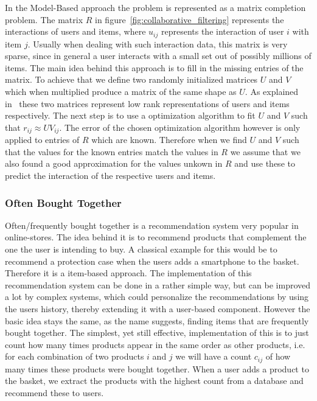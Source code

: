 In the Model-Based approach the problem is represented as a matrix completion problem.
The matrix $R$ in figure~\ref{fig:collaborative_filtering} represents the interactions of users and items, where $u_{ij}$ represents the interaction of user $i$ with item $j$.
Usually when dealing with such interaction data, this matrix is very sparse, since in general a user interacts with a small set out of possibly millions of items.
The main idea behind this approach is to fill in the missing entries of the matrix.
To achieve that we define two randomly initialized matrices $U$ and $V$ which when multiplied produce a matrix of the same shape as $U$.
As explained in~\cite{collaborative_filtering} these two matrices represent low rank representations of users and items respectively.
The next step is to use a optimization algorithm to fit $U$ and $V$ such that $r_{ij} \approx UV_{ij}$.
The error of the chosen optimization algorithm however is only applied to entries of $R$ which are known.
Therefore when we find $U$ and $V$ such that the values for the known entries match the values in $R$ we assume that we also found a good approximation for the values unkown in $R$ and use these to predict the interaction of the respective users and items.

\subsubsection{Often Bought Together}
Often/frequently bought together is a recommendation system very popular in online-stores.
The idea behind it is to recommend products that complement the one the user is intending to buy.
A classical example for this would be to recommend a protection case when the users adds a smartphone to the basket.
Therefore it is a item-based approach.
The implementation of this recommendation system can be done in a rather simple way, but can be improved a lot by complex systems, which could personalize the recommendations by using the users history, thereby extending it with a user-based component.
However the basic idea stays the same, as the name suggests, finding items that are frequently bought together.
The simplest, yet still effective, implementation of this is to just count how many times products appear in the same order as other products, i.e. for each combination of two products $i$ and $j$ we will have a count $c_{ij}$ of how many times these products were bought together.
When a user adds a product to the basket, we extract the products with the highest count from a database and recommend these to users.


